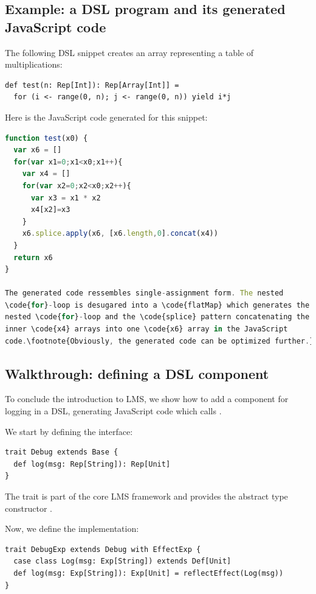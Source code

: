 \documentclass[runningheads,a4paper]{llncs}
\begin{document}
\subsection{Example: a DSL program and its generated JavaScript code}

The following DSL snippet creates an array representing a table of
multiplications:
\begin{lstlisting}
def test(n: Rep[Int]): Rep[Array[Int]] =
  for (i <- range(0, n); j <- range(0, n)) yield i*j
\end{lstlisting}

Here is the JavaScript code generated for this snippet:
\begin{lstlisting}[language=JavaScript]
function test(x0) {
  var x6 = []
  for(var x1=0;x1<x0;x1++){
    var x4 = []
    for(var x2=0;x2<x0;x2++){
      var x3 = x1 * x2
      x4[x2]=x3
    }
    x6.splice.apply(x6, [x6.length,0].concat(x4))
  }
  return x6
}

The generated code ressembles single-assignment form. The nested
\code{for}-loop is desugared into a \code{flatMap} which generates the
nested \code{for}-loop and the \code{splice} pattern concatenating the
inner \code{x4} arrays into one \code{x6} array in the JavaScript
code.\footnote{Obviously, the generated code can be optimized further.}

\end{lstlisting}

\subsection{Walkthrough: defining a DSL component}\label{sec:defineDslComponent}

To conclude the introduction to LMS, we show how to add a component
for logging in a DSL, generating JavaScript code which calls
.

We start by defining the interface:
\begin{lstlisting}
trait Debug extends Base {
  def log(msg: Rep[String]): Rep[Unit]
}
\end{lstlisting}

The  trait is part of the core LMS framework and provides
the abstract type constructor .

Now, we define the implementation:
\begin{lstlisting}
trait DebugExp extends Debug with EffectExp {
  case class Log(msg: Exp[String]) extends Def[Unit]
  def log(msg: Exp[String]): Exp[Unit] = reflectEffect(Log(msg))
}
\end{lstlisting}
\end{document}
